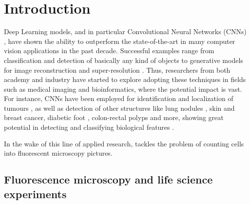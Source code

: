 \chapter{Introduction}
\label{chap:partI_intro}

Deep Learning models, and in particular Convolutional Neural Networks (CNNs) \cite{jimenez, greenspan}, have shown the ability to outperform the state-of-the-art in many computer vision applications in the past decade. 
Successful examples range from classification and detection of basically any kind of objects \cite{AlexNet, YOLO} to generative models for image reconstruction \cite{reconstruction} and super-resolution \cite{super-resolution}.
Thus, researchers from both academy and industry have started to explore adopting these techniques in fields such as medical imaging and bioinformatics, where the potential impact is vast.
For instance, CNNs have been employed for identification and localization of tumours \cite{brain_tumor,breast_cancer, ciresan2012deep, cirecsan2013mitosis}, as well as detection of other structures like lung nodules \cite{lung_nodules, meraj2020lung, su2021lung}, skin and breast cancer, diabetic foot \cite{TL_medical_imaging}, colon-rectal polyps \cite{korbar} and more, showing great potential in detecting and classifying biological features \cite{lundervold, sahiner, yadav}.

In the wake of this line of applied research,  tackles the problem of counting cells into fluorescent microscopy pictures.

\section{Fluorescence microscopy and life science experiments}
\label{sec:fluorescence_microscopy}


